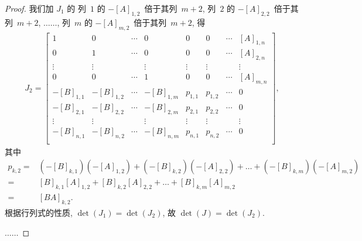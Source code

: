 \documentclass[%
    UTF8,%
    fontset=none,%
    punct=kaiming,%
    zihao=-4,%
    a4paper,%
    oneside,%
]{ctexbook}
\begin{document}
\begin{proof}
    我们加 \(J_1\) 的%
    列~\(1\) 的 \(-[A]_{1,2}\)~倍于其列~\(m+2\),
    列~\(2\) 的 \(-[A]_{2,2}\)~倍于其列~\(m+2\),
    \(\dots\dots\),
    列~\(m\) 的 \(-[A]_{m,2}\)~倍于其列~\(m+2\),
    得
    \begin{align*}
        J_2 =
        \begin{bmatrix}
            1          & 0          & \cdots & 0          &
            0          & 0          & \cdots & [A]_{1,n}    \\
            0          & 1          & \cdots & 0          &
            0          & 0          & \cdots & [A]_{2,n}    \\
            \vdots     & \vdots     & {}     & \vdots     &
            \vdots     & \vdots     & {}     & \vdots       \\
            0          & 0          & \cdots & 1          &
            0          & 0          & \cdots & [A]_{m,n}    \\
            -[B]_{1,1} & -[B]_{1,2} & \cdots & -[B]_{1,m} &
            p_{1,1}    & p_{1,2}    & \cdots & 0            \\
            -[B]_{2,1} & -[B]_{2,2} & \cdots & -[B]_{2,m} &
            p_{2,1}    & p_{2,2}    & \cdots & 0            \\
            \vdots     & \vdots     & {}     & \vdots     &
            \vdots     & \vdots     & {}     & \vdots       \\
            -[B]_{n,1} & -[B]_{n,2} & \cdots & -[B]_{n,m} &
            p_{n,1}    & p_{n,2}    & \cdots & 0            \\
        \end{bmatrix},
    \end{align*}
    其中
    \begin{align*}
        p_{k,2}
        = {} &
        (-[B]_{k,1})(-[A]_{1,2})
        + (-[B]_{k,2})(-[A]_{2,2})
        + \dots
        + (-[B]_{k,m})(-[A]_{m,2})
        \\
        = {} &
        [B]_{k,1} [A]_{1,2}
        + [B]_{k,2} [A]_{2,2}
        + \dots
        + [B]_{k,m} [A]_{m,2}
        \\
        = {} &
        [BA]_{k,2}.
    \end{align*}
    根据行列式的性质,
    \(\det {(J_1)} = \det {(J_2)}\),
    故
    \(\det {(J)} = \det {(J_2)}\).

    \(\dots\dots\)


\end{proof}
\end{document}
